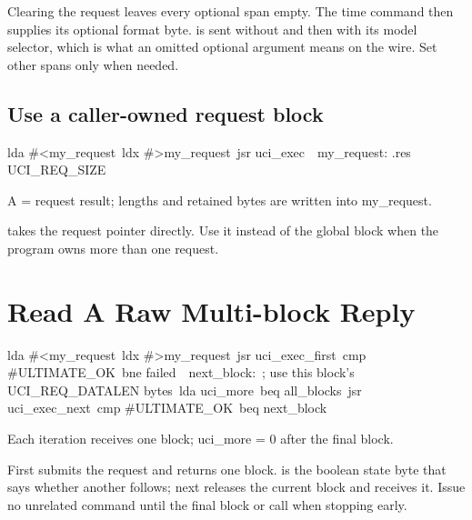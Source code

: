 Clearing the request leaves every optional span empty. The time command then
supplies its optional format byte.  is sent without and then
with its model selector, which is what an omitted optional argument means on
the wire. Set other spans only when needed.

\subsection*{Use a caller-owned request block}

\begin{listingbox}
\hspace*{2em}lda \#<my\_request\
\hspace*{2em}ldx \#>my\_request\
\hspace*{2em}jsr uci\_exec\
\
my\_request: .res UCI\_REQ\_SIZE
\end{listingbox}

\begin{resultbox}
A = request result; lengths and retained bytes are written into my_request.
\end{resultbox}

\cmd{uci\_exec} takes the request pointer directly. Use it instead of the
global block when the program owns more than one request.

\section{Read A Raw Multi-block Reply}

\begin{listingbox}
\hspace*{2em}lda \#<my\_request\
\hspace*{2em}ldx \#>my\_request\
\hspace*{2em}jsr uci\_exec\_first\
\hspace*{2em}cmp \#ULTIMATE\_OK\
\hspace*{2em}bne failed\
\
next\_block:\
\hspace*{2em}; use this block's UCI\_REQ\_DATALEN bytes\
\hspace*{2em}lda uci\_more\
\hspace*{2em}beq all\_blocks\
\hspace*{2em}jsr uci\_exec\_next\
\hspace*{2em}cmp \#ULTIMATE\_OK\
\hspace*{2em}beq next\_block
\end{listingbox}

\begin{resultbox}
Each iteration receives one block; uci_more = 0 after the final block.
\end{resultbox}

First submits the request and returns one block.  is the boolean
state byte that says whether another follows; next releases the current block
and receives it. Issue no unrelated command until the final block or call
 when stopping early.

